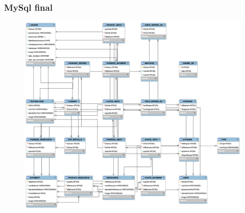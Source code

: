 \documentclass[11pt,a4paper]{article}
\begin{document}
\subsubsection{MySql final}
\begin{figure}[!h]
\includegraphics[scale=0.3]{./sql/final.png}
\end{figure}
\end{document}
